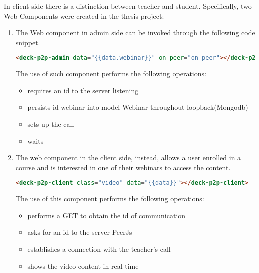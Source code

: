 In client side there is a distinction between teacher and student. Specifically, two Web Components were created in the thesis project:
\begin{enumerate}

\item The Web component in admin side can be invoked through the following code snippet.

\begin{lstlisting}[language=html]
 <deck-p2p-admin data="{{data.webinar}}" on-peer="on_peer"></deck-p2p-admin>
\end{lstlisting}


The use of such component performs the following operations:
\begin{itemize}
\item requires an id to the server listening
\item persists id webinar into model Webinar throughout loopback(Mongodb)
\item sets up the call
\item waits
\end{itemize}


\item 
The web component in the client side, instead, allows a user enrolled in a course and is interested in one of their webinars to access the content.

\begin{lstlisting}[language=html]
  <deck-p2p-client class="video" data="{{data}}"></deck-p2p-client>
\end{lstlisting}
The use of this component performs the following operations:
\begin{itemize}
\item performs a GET to obtain the id of communication
\item asks for an id to the server PeerJs
\item establishes a connection with the teacher's call
\item shows the video content in real time
\end{itemize}

\end{enumerate}



